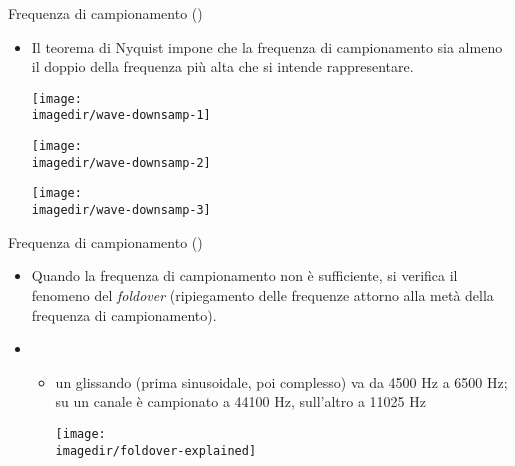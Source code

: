 %
%
%
%
%
\setcounter{ms}{1}
\begin{slide}{{\small Frequenza di campionamento ()}}

	\begin{itemize}

		\item Il teorema di Nyquist impone che la frequenza di
			campionamento sia almeno il doppio della frequenza
			pi\`u alta che si intende rappresentare.

			\begin{center}
				\texttt{[image: \\imagedir/wave-downsamp-1]}

				\texttt{[image: \\imagedir/wave-downsamp-2]}

				\texttt{[image: \\imagedir/wave-downsamp-3]}
			\end{center}

	\end{itemize}

\end{slide}

\begin{slide}{{\small Frequenza di campionamento ()}}
{\scriptsize
	\begin{itemize}

		\item Quando la frequenza di campionamento non \`e sufficiente,
              si verifica il fenomeno del \emph{foldover}
			  (ripiegamento delle frequenze attorno alla met\`a
			  della frequenza di campionamento).

		\item {}

			\begin{itemize}

				\item un glissando (prima sinusoidale, poi complesso)
					  va da 4500 Hz a 6500 Hz;
					  su un canale \`e campionato a 44100 Hz,
                      sull'altro a 11025 Hz

					  \begin{center}
						\texttt{[image: \\imagedir/foldover-explained]}
					  \end{center}

			\end{itemize}

	\end{itemize}
}
\end{slide}

